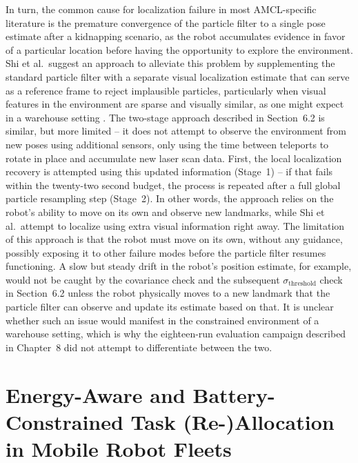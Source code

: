 In turn, the common cause for localization failure in most AMCL-specific literature is the premature convergence of the particle filter to a single pose estimate after a kidnapping scenario, as the robot accumulates evidence in favor of a particular location before having the opportunity to explore the environment. Shi et al.\ suggest an approach to alleviate this problem by supplementing the standard particle filter with a separate visual localization estimate that can serve as a reference frame to reject implausible particles, particularly when visual features in the environment are sparse and visually similar, as one might expect in a warehouse setting \cite{shi2022vision}. The two-stage approach described in Section~6.2 is similar, but more limited – it does not attempt to observe the environment from new poses using additional sensors, only using the time between teleports to rotate in place and accumulate new laser scan data. First, the local localization recovery is attempted using this updated information (Stage~1) – if that fails within the twenty-two second budget, the process is repeated after a full global particle resampling step (Stage~2). In other words, the approach relies on the robot's ability to move on its own and observe new landmarks, while Shi et al.\ attempt to localize using extra visual information right away. The limitation of this approach is that the robot must move on its own, without any guidance, possibly exposing it to other failure modes before the particle filter resumes functioning. A slow but steady drift in the robot's position estimate, for example, would not be caught by the covariance check and the subsequent $\sigma_{\text{threshold}}$ check in Section~6.2 unless the robot physically moves to a new landmark that the particle filter can observe and update its estimate based on that. It is unclear whether such an issue would manifest in the constrained environment of a warehouse setting, which is why the eighteen-run evaluation campaign described in Chapter~8 did not attempt to differentiate between the two.

\section{Energy-Aware and Battery-Constrained Task (Re-)Allocation in Mobile Robot Fleets}

